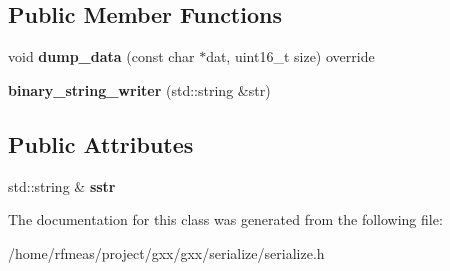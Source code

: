 \subsection*{Public Member Functions}
\begin{DoxyCompactItemize}
\item 
void {\bfseries dump\+\_\+data} (const char $\ast$dat, uint16\+\_\+t size) override\hypertarget{classgxx_1_1archive_1_1binary__string__writer_ae4512b00c3764d825089d4b36fd56115}{}\label{classgxx_1_1archive_1_1binary__string__writer_ae4512b00c3764d825089d4b36fd56115}

\item 
{\bfseries binary\+\_\+string\+\_\+writer} (std\+::string \&str)\hypertarget{classgxx_1_1archive_1_1binary__string__writer_a99ad4c8bb49e1e8ebc0009a4be8e61d0}{}\label{classgxx_1_1archive_1_1binary__string__writer_a99ad4c8bb49e1e8ebc0009a4be8e61d0}

\end{DoxyCompactItemize}
\subsection*{Public Attributes}
\begin{DoxyCompactItemize}
\item 
std\+::string \& {\bfseries sstr}\hypertarget{classgxx_1_1archive_1_1binary__string__writer_af2aa4f19499b335fadcb430a43a353eb}{}\label{classgxx_1_1archive_1_1binary__string__writer_af2aa4f19499b335fadcb430a43a353eb}

\end{DoxyCompactItemize}


The documentation for this class was generated from the following file\+:\begin{DoxyCompactItemize}
\item 
/home/rfmeas/project/gxx/gxx/serialize/serialize.\+h\end{DoxyCompactItemize}
